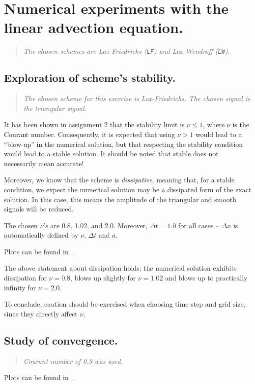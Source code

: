 
\section{Numerical experiments with the linear advection equation.}
\label{sec:task1}
\begin{quote}
\em The chosen schemes are Lax-Friedrichs (\texttt{LF}) and Lax-Wendroff (\texttt{LW}).
\end{quote}
\subsection{Exploration of scheme's stability.}
\label{eq:11}
\begin{quote}
 \em The chosen scheme for this exercise is Lax-Friedrichs. The chosen signal is the triangular signal.
\end{quote}

It has been shown in assignment 2 that the stability limit is $\nu \le 1$, where $\nu$ is the Courant number. Consequently, it is expected that using $\nu > 1$ would lead to a ``blow-up'' in the numerical solution, but that respecting the stability condition would lead to a stable solution. It should be noted that stable does not necessarily mean accurate!

Moreover, we know that the scheme is \emph{dissipative}, meaning that, for a stable condition, we expect the numerical solution may be a dissipated form of the exact solution. In this case, this means the amplitude of the triangular and smooth signals will be reduced.

The chosen $\nu$'s are 0.8, 1.02, and 2.0. Moreover, $\Delta t = 1.0$ for all cases -- $\Delta x$ is automatically defined by $\nu$, $\Delta t$ and $a$.

Plots can be found in~.

The above statement about dissipation holds: the numerical solution exhibits dissipation for $\nu = 0.8$, blows up slightly for $\nu = 1.02$ and blows up to practically infinity for $\nu = 2.0$.

To conclude, caution should be exercised when choosing time step and grid size, since they directly affect $\nu$.


\subsection{Study of convergence.}
\begin{quote}
\em Courant number of 0.9 was used.
\end{quote}
Plots can be found in~.

